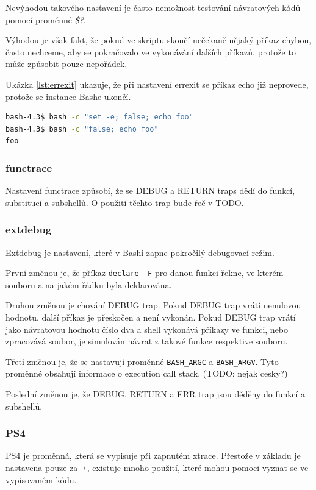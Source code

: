 \documentclass[thesis=M,czech]{FITthesis}[2012/06/26]
\begin{document}
Nevýhodou takového nastavení je často nemožnost testování návratových kódů pomocí proměnné \textit{\$?}.

Výhodou je však fakt, že pokud ve skriptu skončí nečekaně nějaký příkaz chybou, často nechceme, aby se pokračovalo ve vykonávání dalších příkazů, protože to může způsobit pouze nepořádek.

Ukázka \ref{lst:errexit} ukazuje, že při nastavení errexit se příkaz echo již neprovede, protože se instance Bashe ukončí.

\begin{lstlisting}[language=bash, caption={errexit}, label={lst:errexit}]
bash-4.3$ bash -c "set -e; false; echo foo"
bash-4.3$ bash -c "false; echo foo"
foo
\end{lstlisting}

%
%
%
\subsubsection{functrace}

Nastavení functrace způsobí, že se DEBUG a RETURN traps dědí do funkcí, substitucí a subshellů. O použití těchto trap bude řeč v TODO.


%
%
%
\subsubsection{extdebug}

Extdebug je nastavení, které v Bashi zapne pokročilý debugovací režim.

První změnou je, že příkaz \texttt{declare -F} pro danou funkci řekne, ve kterém souboru a na jakém řádku byla deklarována.

Druhou změnou je chování DEBUG trap. Pokud DEBUG trap vrátí nenulovou hodnotu, další příkaz je přeskočen a není vykonán. Pokud DEBUG trap vrátí jako návratovou hodnotu číslo dva a shell vykonává příkazy ve funkci, nebo zpracovává soubor, je simulován návrat z takové funkce respektive souboru.

Třetí změnou je, že se nastavují proměnné \texttt{BASH\_ARGC} a \texttt{BASH\_ARGV}. Tyto proměnné obsahují informace o execution call stack. (TODO: nejak cesky?)

Poslední změnou je, že DEBUG, RETURN a ERR trap jsou děděny do funkcí a subshellů.

%
%
%
\subsubsection{PS4}
PS4 je proměnná, která se vypisuje při zapnutém xtrace. Přestože v základu je nastavena pouze za \textit{+}, existuje mnoho použití, které mohou pomoci vyznat se ve vypisovaném kódu. 
\end{document}
